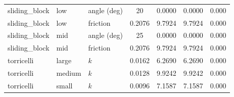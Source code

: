 \begin{table}[t]
\begin{tabular}{@{}lllS[table-format=2.4]S[table-format=2.4]S[table-format=2.4]S[table-format=-2.4]@{}}
sliding\_block & low   & angle (deg) & 20 & 0.0000 & 0.0000 & 0.000 \\
sliding\_block & low   & friction & 0.2076 & 9.7924 & 9.7924 & 0.000 \\
sliding\_block & mid   & angle (deg) & 25 & 0.0000 & 0.0000 & 0.000 \\
sliding\_block & mid   & friction & 0.2076 & 9.7924 & 9.7924 & 0.000 \\
torricelli   & large  & $k$ & 0.0162 & 6.2690 & 6.2690 & 0.000 \\
torricelli   & medium & $k$ & 0.0128 & 9.9242 & 9.9242 & 0.000 \\
torricelli   & small  & $k$ & 0.0096 & 7.1587 & 7.1587 & 0.000 \\
\bottomrule
\end{tabular}
\end{table}
